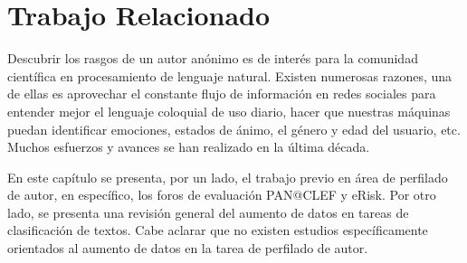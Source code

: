 \chapter{Trabajo Relacionado}

Descubrir los rasgos de un autor anónimo es de interés para la comunidad científica en procesamiento de lenguaje natural. Existen numerosas razones, una de ellas es aprovechar el constante flujo de información en redes sociales para entender mejor el lenguaje coloquial de uso diario, hacer que nuestras máquinas puedan identificar emociones, estados de ánimo, el género y edad del usuario, etc. Muchos esfuerzos y avances se han realizado en la última década. 

En este capítulo se presenta, por un lado, el trabajo previo en área de perfilado de autor, en específico, los foros de evaluación PAN@CLEF y eRisk. Por otro lado, se presenta una revisión general del aumento de datos en tareas de clasificación de textos. Cabe aclarar que no existen estudios específicamente orientados al aumento de datos en la tarea de perfilado de autor. 
















